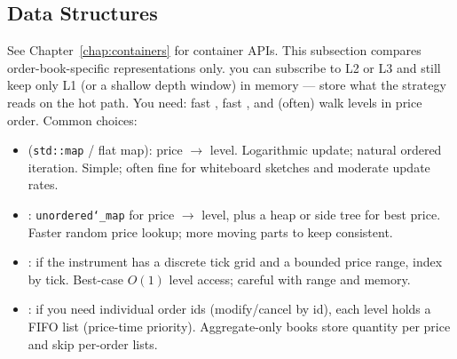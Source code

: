 \subsection{Data Structures}
\label{subsec:order-book-data-structures}
See Chapter~\ref{chap:containers} for container APIs. 
This subsection compares order-book-specific representations only.
\newline
{} you can subscribe to L2 or L3 and still keep only 
L1 (or a shallow depth window) in memory --- store what the strategy reads on the hot path.
\newline
You need: fast , fast , and (often) 
walk levels in price order. Common choices:
\begin{itemize}
    \item {} (\texttt{std::map} / flat map): price $\rightarrow$ level. 
          Logarithmic update; natural ordered iteration. Simple; often fine for whiteboard 
          sketches and moderate update rates.
    \item {}: \texttt{unordered\char`_map} for 
          price $\rightarrow$ level, plus a heap or side tree for best price. Faster random 
          price lookup; more moving parts to keep consistent.
    \item {}: if the instrument has a discrete 
          tick grid and a bounded price range, index by tick. Best-case $O(1)$ level access; 
          careful with range and memory.
    \item {}: if you need individual order ids (modify/cancel 
          by id), each level holds a FIFO list (price-time priority). Aggregate-only books 
          store quantity per price and skip per-order lists.
\end{itemize}

